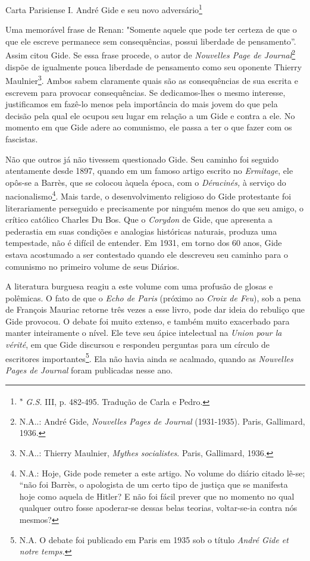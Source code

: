 Carta Parisiense I. André Gide e seu novo adversário\footnote{\textsuperscript{∗}
  \emph{G.S.} III, p. 482-495. Tradução de Carla e Pedro.}

Uma memorável frase de Renan: "Somente aquele que pode ter certeza de
que o que ele escreve permanece sem consequências, possui liberdade de
pensamento''. Assim citou Gide. Se essa frase procede, o autor de
\emph{Nouvelles Page de Journal}\footnote{N.A..: André Gide,
  \emph{Nouvelles Pages de Journal} (1931-1935). Paris, Gallimard, 1936.}
dispõe de igualmente pouca liberdade de pensamento como seu oponente
Thierry Maulnier\footnote{N.A..: Thierry Maulnier, \emph{Mythes
  socialistes}. Paris, Gallimard, 1936.}. Ambos sabem claramente quais
são as consequências de sua escrita e escrevem para provocar
consequências. Se dedicamos-lhes o mesmo interesse, justificamos em
fazê-lo menos pela importância do mais jovem do que pela decisão pela
qual ele ocupou seu lugar em relação a um Gide e contra a ele. No
momento em que Gide adere ao comunismo, ele passa a ter o que fazer com
os fascistas.

Não que outros já não tivessem questionado Gide. Seu caminho foi seguido
atentamente desde 1897, quando em um famoso artigo escrito no
\emph{Ermitage}, ele opôs-se a Barrès, que se colocou àquela época, com
o \emph{Déracinés,} à serviço do nacionalismo\footnote{N.A.: Hoje, Gide
  pode remeter a este artigo. No volume do diário citado lê-se; ``não
  foi Barrès, o apologista de um certo tipo de justiça que se manifesta
  hoje como aquela de Hitler? E não foi fácil prever que no momento no
  qual qualquer outro fosse apoderar-se dessas belas teorias,
  voltar-se-ia contra nós mesmos?}. Mais tarde, o desenvolvimento
religioso do Gide protestante foi literariamente perseguido e
precisamente por ninguém menos do que seu amigo, o crítico católico
Charles Du Bos. Que o \emph{Corydon} de Gide, que apresenta a pederastia
em suas condições e analogias históricas naturais, produza uma
tempestade, não é difícil de entender. Em 1931, em torno dos 60 anos,
Gide estava acostumado a ser contestado quando ele descreveu seu caminho
para o comunismo no primeiro volume de seus Diários.

A literatura burguesa reagiu a este volume com uma profusão de glosas e
polêmicas. O fato de que o \emph{Echo de Paris} (próximo ao \emph{Croix
de Feu}), sob a pena de François Mauriac retorne três vezes a esse
livro, pode dar ideia do rebuliço que Gide provocou. O debate foi muito
extenso, e também muito exacerbado para manter inteiramente o nível. Ele
teve seu ápice intelectual na \emph{Union pour la vérité}, em que Gide
discursou e respondeu perguntas para um círculo de escritores
importantes\footnote{N.A. O debate foi publicado em Paris em 1935 sob o
  título \emph{André Gide et notre temps.}}. Ela não havia ainda se
acalmado, quando as \emph{Nouvelles Pages de Journal} foram publicadas
nesse ano.


